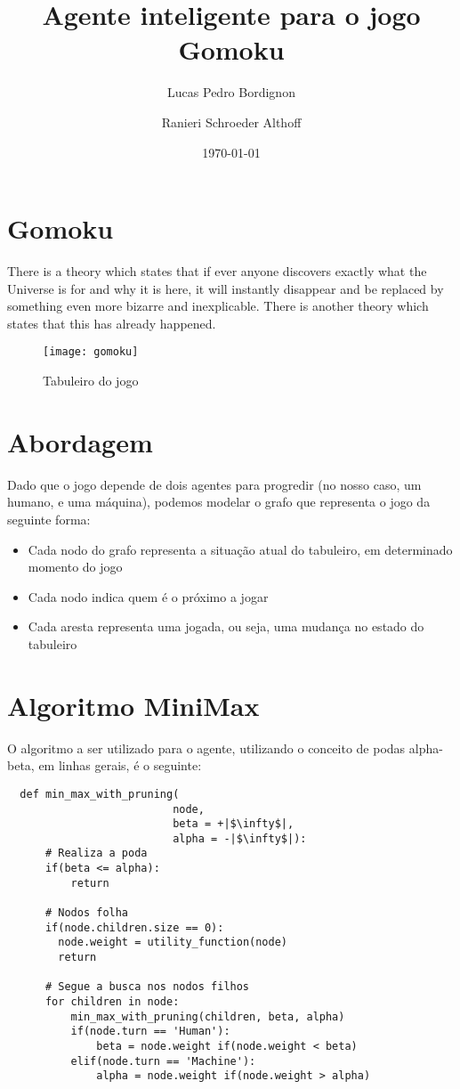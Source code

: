 \documentclass{article}
\title{Agente inteligente para o jogo Gomoku}
\author{Lucas Pedro Bordignon \and Ranieri Schroeder Althoff}
\date{\today}
\begin{document}
\maketitle

\section{Gomoku}
There is a theory which states that if ever anyone discovers exactly what the Universe is for and why it is here, it will instantly disappear and be replaced by something even more bizarre and inexplicable.
There is another theory which states that this has already happened.

\begin{figure}[h!]
  \centering
  \texttt{[image: gomoku]}
  \caption{Tabuleiro do jogo}
  \label{fig:gomoku}
\end{figure}

\section{Abordagem}
Dado que o jogo depende de dois agentes para progredir (no nosso caso, um humano, e uma máquina), podemos modelar o
grafo que representa o jogo da seguinte forma:

\begin{itemize}
  \item Cada nodo do grafo representa a situação atual do tabuleiro, em determinado momento do jogo
  \item Cada nodo indica quem é o próximo a jogar
  \item Cada aresta representa uma jogada, ou seja, uma mudança no estado do tabuleiro
\end{itemize}

\section{Algoritmo MiniMax}
O algoritmo a ser utilizado para o agente, utilizando o conceito de podas alpha-beta, em linhas gerais, é o seguinte:

\begin{verbatim}
  def min_max_with_pruning(
                          node,
                          beta = +|$\infty$|,
                          alpha = -|$\infty$|):
      # Realiza a poda
      if(beta <= alpha):
          return

      # Nodos folha
      if(node.children.size == 0):
        node.weight = utility_function(node)
        return

      # Segue a busca nos nodos filhos
      for children in node:
          min_max_with_pruning(children, beta, alpha)
          if(node.turn == 'Human'):
              beta = node.weight if(node.weight < beta)
          elif(node.turn == 'Machine'):
              alpha = node.weight if(node.weight > alpha)
\end{verbatim}
\end{document}
